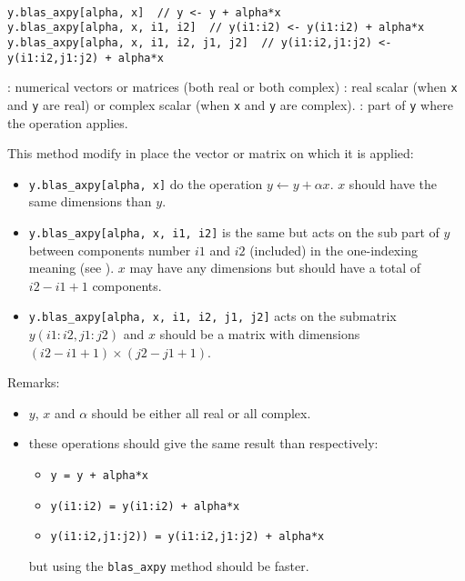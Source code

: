 \begin{mandesc}
  \\ 
\end{mandesc}
\begin{calling_sequence}
\begin{verbatim}
y.blas_axpy[alpha, x]  // y <- y + alpha*x
y.blas_axpy[alpha, x, i1, i2]  // y(i1:i2) <- y(i1:i2) + alpha*x
y.blas_axpy[alpha, x, i1, i2, j1, j2]  // y(i1:i2,j1:j2) <- y(i1:i2,j1:j2) + alpha*x
\end{verbatim}
\end{calling_sequence}
\begin{parameters}
  \begin{varlist}
    : numerical vectors or matrices (both real or both complex)
    : real scalar (when \verb+x+ and \verb+y+ are real) or complex scalar (when \verb+x+ and \verb+y+ 
                   are complex).
    : part of \verb+y+ where the operation applies.
  \end{varlist}
\end{parameters}

\begin{mandescription}

This method modify in place the vector or matrix on which it is applied:
\begin{itemize}
\item \verb+y.blas_axpy[alpha, x]+ do the operation $y \leftarrow y + \alpha x$.
      $x$ should have the same dimensions than $y$.
\item \verb+y.blas_axpy[alpha, x, i1, i2]+ is the same but acts on the sub part of 
      $y$ between components number $i1$ and $i2$ (included) in the one-indexing
      meaning  (see ). $x$ may have
      any dimensions but should have a total of $i2-i1+1$ components.
\item \verb+y.blas_axpy[alpha, x, i1, i2, j1, j2]+ acts on the submatrix $y(i1:i2,j1:j2)$
      and $x$ should be a matrix with dimensions $(i2-i1+1)\times(j2-j1+1)$.  
\end{itemize}
Remarks:
\begin{itemize} 
\item $y$, $x$ and $\alpha$ should be either all real or all complex.
\item these operations should give the same result than respectively:
      \begin{itemize}
      \item \verb-y = y + alpha*x-
      \item \verb-y(i1:i2) = y(i1:i2) + alpha*x-
      \item \verb-y(i1:i2,j1:j2)) = y(i1:i2,j1:j2) + alpha*x-
      \end{itemize}
      but using the \verb+blas_axpy+ method should be faster.
\end{itemize}
\end{mandescription}

